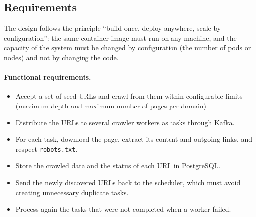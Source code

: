 \subsection{Requirements}
The design follows the principle ``build once, deploy anywhere, scale by configuration'': the same container image must run on any machine, and the capacity of the system must be changed by configuration (the number of pods or nodes) and not by changing the code.

\paragraph{Functional requirements.}
\begin{itemize}
    \item[\textbf{FR1}] Accept a set of seed URLs and crawl from them within configurable limits (maximum depth and maximum number of pages per domain).
    \item[\textbf{FR2}] Distribute the URLs to several crawler workers as tasks through Kafka.
    \item[\textbf{FR3}] For each task, download the page, extract its content and outgoing links, and respect \texttt{robots.txt}.
    \item[\textbf{FR4}] Store the crawled data and the status of each URL in PostgreSQL.
    \item[\textbf{FR5}] Send the newly discovered URLs back to the scheduler, which must avoid creating unnecessary duplicate tasks.
    \item[\textbf{FR6}] Process again the tasks that were not completed when a worker failed.
\end{itemize}

